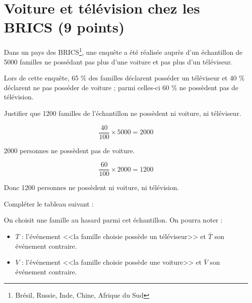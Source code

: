 \section{Voiture et télévision chez les BRICS (9 points)}

Dans un pays des BRICS\footnote{Brésil, Russie, Inde, Chine, Afrique du Sud}, une enquête a été réalisée auprès d'un échantillon  de 5000 familles ne possédant pas plus d'une voiture et pas plus d'un téléviseur.

Lors de cette enquête, 65 \% des familles déclarent posséder un téléviseur et 40 \% déclarent ne pas posséder de voiture ; parmi celles-ci 60 \% ne possèdent pas de télévision. 

\begin{questions}
	\question[2] Justifier que \num{1200} familles de l'échantillon ne possèdent ni voiture, ni téléviseur.
	\begin{solution}
		\begin{equation*}
			\dfrac{40}{100} \times \num{5000} = \num{2000}			
		\end{equation*}
	
	\num{2000} personnes ne possèdent pas de voiture.
	
	
		\begin{equation*}
			\dfrac{60}{100} \times \num{2000} = \num{1200}
		\end{equation*}
	
	Donc \num{1200} personnes ne possèdent ni voiture, ni télévision.
	\end{solution}
	
	\question[3] Compléter le tableau suivant :
	
		\begin{center}
			
		\end{center}
	
		\begin{solution}
			\begin{center}
				
			\end{center}
		\end{solution}
	
	\question[3] On choisit une famille au hasard parmi cet échantillon. 
	On pourra noter :
	
	\begin{itemize}
		\item $T$ : l'événement <<la famille choisie possède un téléviseur>> et $\bar{T}$ son événement contraire.
		
		\item $V$ : l'événement <<la famille choisie possède une voiture>> et $\bar{V}$ son événement contraire.
	\end{itemize}


\end{questions}
